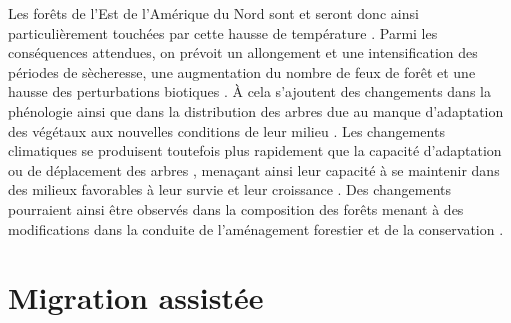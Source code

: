 Les forêts de l'Est de l'Amérique du Nord sont et seront donc ainsi particulièrement touchées par cette hausse de température \citep{Park2014Canboreal,Mahony2017closerlook,Sittaro2017Treerange,Messier2022Warningnatural}.
Parmi les conséquences attendues, on prévoit un allongement et une intensification des périodes de sècheresse, une augmentation du nombre de feux de forêt et une hausse des perturbations biotiques \citep{Parmesan2007Influencesspecies,Joyce2013Climatechange,Gatti2021Amazoniacarbon,Heidari2021Effectsclimate}. 
À cela s'ajoutent des changements dans la phénologie \citep{Chuine2010Whydoes} ainsi que dans la distribution des arbres \citep{Zhu2012Failuremigrate,Gray2013Trackingsuitable} due au manque d'adaptation des végétaux aux nouvelles conditions de leur milieu \citep{Aitken2008Adaptationmigration}.
Les changements climatiques se produisent toutefois plus rapidement que la capacité d'adaptation ou de déplacement des arbres \citep{Aitken2008Adaptationmigration,Loarie2009velocityclimate,Vitt2010Assistedmigration,Harrison2020Plantcommunity}, 
menaçant ainsi leur capacité à se maintenir dans des milieux favorables à leur survie et leur croissance \citep{Zhu2012Failuremigrate,Sittaro2017Treerange,Woodall2018Decadalchanges}.
Des changements pourraient ainsi être observés dans la composition des forêts menant à des modifications dans la conduite de l'aménagement forestier et de la conservation \citep{McKenney2009Climatechange,Chmura2011Forestresponses,Lo2011Linkingclimate}.


\section*{Migration assistée}
\label{sec:fam}

